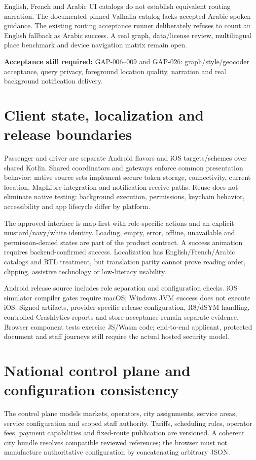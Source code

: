 \documentclass[11pt,a4paper]{article}
\newcommand{\gate}[1]{\par\textbf{Acceptance still required:} #1\par}
\begin{document}
English, French and Arabic UI catalogs do not establish equivalent routing
narration. The documented pinned Valhalla catalog lacks accepted Arabic spoken
guidance. The existing routing acceptance runner deliberately refuses to count
an English fallback as Arabic success. A real graph, data/license review,
multilingual place benchmark and device navigation matrix remain open.
\gate{GAP-006--009 and GAP-026: graph/style/geocoder acceptance, query privacy,
foreground location quality, narration and real background notification delivery.}

\section{Client state, localization and release boundaries}
Passenger and driver are separate Android flavors and iOS targets/schemes over
shared Kotlin. Shared coordinators and gateways enforce common presentation
behavior; native source sets implement secure token storage, connectivity,
current location, MapLibre integration and notification receive paths. Reuse
does not eliminate native testing: background execution, permissions, keychain
behavior, accessibility and app lifecycle differ by platform.

The approved interface is map-first with role-specific actions and an explicit
mustard/navy/white identity. Loading, empty, error, offline, unavailable and
permission-denied states are part of the product contract. A success animation
requires backend-confirmed success. Localization has English/French/Arabic
catalogs and RTL treatment, but translation parity cannot prove reading order,
clipping, assistive technology or low-literacy usability.

Android release source includes role separation and configuration checks. iOS
simulator compiler gates require macOS; Windows JVM success does not execute
iOS. Signed artifacts, provider-specific release configuration, R8/dSYM handling,
controlled Crashlytics reports and store acceptance remain separate evidence.
Browser component tests exercise JS/Wasm code; end-to-end applicant, protected
document and staff journeys still require the actual hosted security model.

\section{National control plane and configuration consistency}
The control plane models markets, operators, city assignments, service areas,
service configuration and scoped staff authority. Tariffs, scheduling rules,
operator fees, payment capabilities and fixed-route publication are versioned.
A coherent city bundle resolves compatible reviewed references; the browser
must not manufacture authoritative configuration by concatenating arbitrary JSON.
\end{document}
